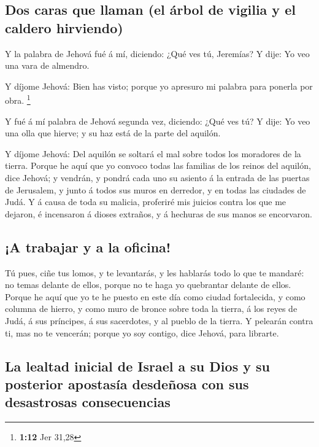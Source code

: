 \hypertarget{dos-caras-que-llaman-el-uxe1rbol-de-vigilia-y-el-caldero-hirviendo}{%
\subsection{Dos caras que llaman (el árbol de vigilia y el caldero
hirviendo)}\label{dos-caras-que-llaman-el-uxe1rbol-de-vigilia-y-el-caldero-hirviendo}}

 Y la palabra de Jehová fué á mí, diciendo: ¿Qué ves tú,
Jeremías? Y dije: Yo veo una vara de almendro.

 Y díjome Jehová: Bien has visto; porque yo apresuro mi
palabra para ponerla por obra. \footnote{\textbf{1:12} Jer 31,28}

 Y fué á mí palabra de Jehová segunda vez, diciendo: ¿Qué
ves tú? Y dije: Yo veo una olla que hierve; y su haz está de la parte
del aquilón.

 Y díjome Jehová: Del aquilón se soltará el mal sobre todos
los moradores de la tierra.  Porque he aquí que yo convoco
todas las familias de los reinos del aquilón, dice Jehová; y vendrán, y
pondrá cada uno su asiento á la entrada de las puertas de Jerusalem, y
junto á todos sus muros en derredor, y en todas las ciudades de Judá.
 Y á causa de toda su malicia, proferiré mis juicios contra
los que me dejaron, é incensaron á dioses extraños, y á hechuras de sus
manos se encorvaron.

\hypertarget{a-trabajar-y-a-la-oficina}{%
\subsection{¡A trabajar y a la
oficina!}\label{a-trabajar-y-a-la-oficina}}

 Tú pues, ciñe tus lomos, y te levantarás, y les hablarás
todo lo que te mandaré: no temas delante de ellos, porque no te haga yo
quebrantar delante de ellos.  Porque he aquí que yo te he
puesto en este día como ciudad fortalecida, y como columna de hierro, y
como muro de bronce sobre toda la tierra, á los reyes de Judá, á sus
príncipes, á sus sacerdotes, y al pueblo de la tierra.  Y
pelearán contra ti, mas no te vencerán; porque yo soy contigo, dice
Jehová, para librarte.

\hypertarget{la-lealtad-inicial-de-israel-a-su-dios-y-su-posterior-apostasuxeda-desdeuxf1osa-con-sus-desastrosas-consecuencias}{%
\subsection{La lealtad inicial de Israel a su Dios y su posterior
apostasía desdeñosa con sus desastrosas
consecuencias}\label{la-lealtad-inicial-de-israel-a-su-dios-y-su-posterior-apostasuxeda-desdeuxf1osa-con-sus-desastrosas-consecuencias}}

